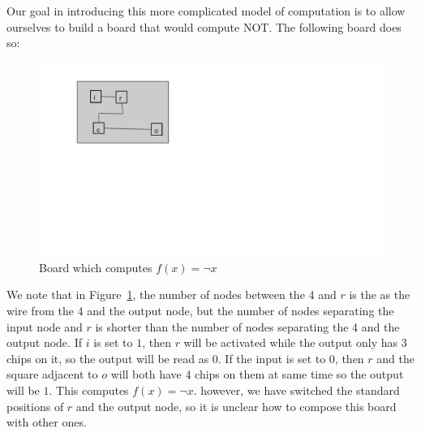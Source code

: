 \documentclass[runningheads,a4paper]{llncs}
\begin{document}







Our goal in introducing this more complicated model of computation is to allow ourselves to build a board that would compute NOT. The following board does so:
\begin{figure}
\centering
\includegraphics[width=0.5\linewidth]{notgate}
\caption{Board which computes $f(x) = \neg x$}
\label{fig:NOT}
\end{figure}
We note that in Figure~\ref{fig:NOT}, the number of nodes between the 4 and $r$ is the as the wire from the 4 and the output node, but the number of nodes separating the input node and $r$ is shorter than the number of nodes separating the 4 and the output node. If $i$ is set to $1$, then $r$ will be activated while the output only has 3 chips on it, so the output will be read as 0. If the input is set to 0, then $r$ and  the square adjacent to $o$ will both have 4 chips on them at same time so the output will be $1$. This computes $f(x) = \neg x$. however, we have switched the standard positions of $r$ and the output node, so it is unclear how to compose this board with other ones. 
\end{document}
